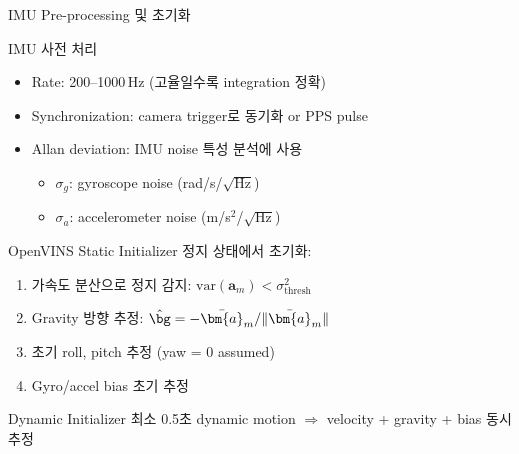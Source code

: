 \begin{frame}[shrink=10]{IMU Pre-processing 및 초기화}
  \begin{block}{IMU 사전 처리}
    \begin{itemize}
      \item Rate: 200--1000\,Hz (고율일수록 integration 정확)
      \item Synchronization: camera trigger로 동기화 or PPS pulse
      \item Allan deviation: IMU noise 특성 분석에 사용
        \begin{itemize}
          \item $\sigma_g$: gyroscope noise (rad/s/$\sqrt{\text{Hz}}$)
          \item $\sigma_a$: accelerometer noise (m/s$^2$/$\sqrt{\text{Hz}}$)
        \end{itemize}
    \end{itemize}
  \end{block}
  \begin{block}{OpenVINS Static Initializer}
    정지 상태에서 초기화:
    \begin{enumerate}
      \item 가속도 분산으로 정지 감지: $\text{var}(\bm{a}_m) < \sigma_{\text{thresh}}^2$
      \item Gravity 방향 추정: $\hat{\bg} = -\bar{\bm{a}}_m / \|\bar{\bm{a}}_m\|$
      \item 초기 roll, pitch 추정 (yaw = 0 assumed)
      \item Gyro/accel bias 초기 추정
    \end{enumerate}
  \end{block}
  \begin{exampleblock}{Dynamic Initializer}
    최소 0.5초 dynamic motion $\Rightarrow$ velocity + gravity + bias 동시 추정
  \end{exampleblock}
\end{frame}


